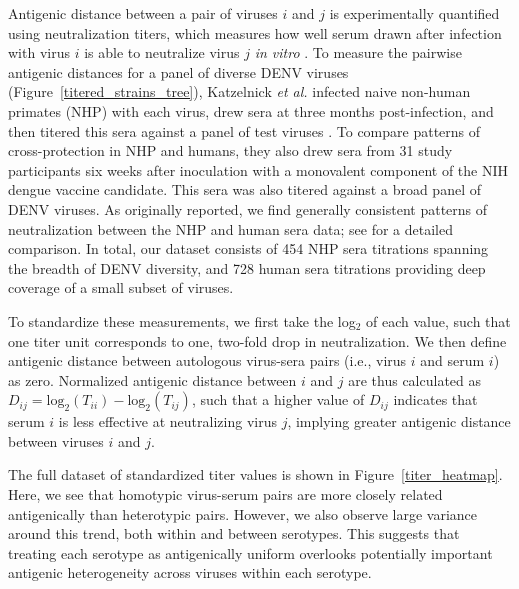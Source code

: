 \documentclass[11pt,oneside,letterpaper]{article}
\begin{document}
Antigenic distance between a pair of viruses $i$ and $j$ is experimentally quantified using neutralization titers, which measures how well serum drawn after infection with virus $i$ is able to neutralize virus $j$ \textit{in vitro} \citep{russell1967dengue}.
To measure the pairwise antigenic distances for a panel of diverse DENV viruses (Figure~\ref{titered_strains_tree}), Katzelnick \textit{et al.} infected naive non-human primates (NHP) with each virus, drew sera at three months post-infection, and then titered this sera against a panel of test viruses \citep{katzelnick2015dengue}.
To compare patterns of cross-protection in NHP and humans, they also drew sera from 31 study participants six weeks after inoculation with a monovalent component of the NIH dengue vaccine candidate.
This sera was also titered against a broad panel of DENV viruses.
As originally reported, we find generally consistent patterns of neutralization between the NHP and human sera data; see \citep{katzelnick2015dengue} for a detailed comparison.
In total, our dataset consists of 454 NHP sera titrations spanning the breadth of DENV diversity, and 728 human sera titrations providing deep coverage of a small subset of viruses.

To standardize these measurements, we first take the log$_2$ of each value, such that one titer unit corresponds to one, two-fold drop in neutralization.
We then define antigenic distance between autologous virus-sera pairs (i.e., virus $i$ and serum $i$) as zero.
Normalized antigenic distance between $i$ and $j$ are thus calculated as $D_{ij} = \mathrm{log}_2(T_{ii}) - \mathrm{log}_2(T_{ij})$, such that a higher value of $D_{ij}$ indicates that serum $i$ is less effective at neutralizing virus $j$, implying greater antigenic distance between viruses $i$ and $j$.

The full dataset of standardized titer values is shown in Figure~\ref{titer_heatmap}.
Here, we see that homotypic virus-serum pairs are more closely related antigenically than heterotypic pairs.
However, we also observe large variance around this trend, both within and between serotypes.
This suggests that treating each serotype as antigenically uniform overlooks potentially important antigenic heterogeneity across viruses within each serotype.
\end{document}
